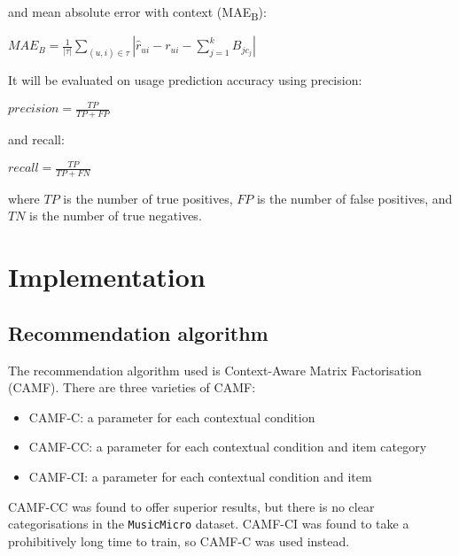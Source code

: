 \documentclass[conference]{IEEEtran}
\begin{document}
and mean absolute error with context (MAE\textsubscript{B}):

\begin{center}

$MAE_B = \frac{1}{|\tau|} \sum_{(u, i) \in \tau} |\hat{r}_{ui} - r_{ui} - \sum_{j=1}^{k} B_{jc_j}|$

\end{center}

It will be evaluated on usage prediction accuracy using precision:

\begin{center}

$precision = \frac{TP}{TP + FP}$

\end{center}

and recall:

\begin{center}

$recall = \frac{TP}{TP + FN}$

\end{center}

where $TP$ is the number of true positives, $FP$ is the number of false positives, and $TN$ is the number of true negatives.

\section{Implementation}

\subsection{Recommendation algorithm}

The recommendation algorithm used is Context-Aware Matrix Factorisation (CAMF). There are three varieties of CAMF:

\begin{itemize}

	\item{CAMF-C: a parameter for each contextual condition}
	\item{CAMF-CC: a parameter for each contextual condition and item category}
	\item{CAMF-CI: a parameter for each contextual condition and item}

\end{itemize}

CAMF-CC was found to offer superior results, but there is no clear categorisations in the \verb|MusicMicro| dataset. CAMF-CI was found to take a prohibitively long time to train, so CAMF-C was used instead.
\end{document}
